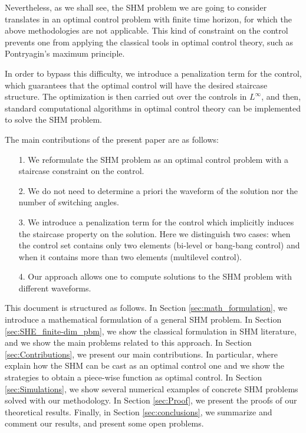\documentclass[twocolumn]{autart}    %
\begin{document}
Nevertheless, as we shall see, the SHM problem we are going to consider translates in an optimal control problem with finite time horizon, for which the above methodologies are not applicable. This kind of constraint on the control prevents one from applying the classical tools in optimal control theory, such as Pontryagin's maximum principle.

In order to bypass this difficulty, we introduce a penalization term for the control, which guarantees that the optimal control will have the desired staircase structure. The optimization is then carried out over the controls in $L^\infty$, and then, standard computational algorithms in optimal control theory can be implemented to solve the SHM problem. 

The main contributions of the present paper are as follows:
\begin{enumerate}
    \item[1.] We reformulate the SHM problem as an optimal control problem with a staircase constraint on the control.
	\item[2.] We do not need to determine a priori the waveform of the solution nor the number of switching angles.  
    \item[3.] We introduce a penalization term for the control which implicitly induces the staircase property on the solution. Here we distinguish two cases: when the control set contains only two elements (bi-level or bang-bang control) and when it contains more than two elements (multilevel control).
    \item[4.] Our approach allows one to compute solutions to the SHM problem with different waveforms.
\end{enumerate}


This document is structured as follows. In Section \ref{sec:math_formulation}, we introduce a mathematical formulation of a general SHM problem. 
In Section \ref{sec:SHE_finite-dim_pbm}, we show the classical formulation in SHM literature, and we show the main problems related to this approach. In Section \ref{sec:Contributions}, we present our main contributions. In particular, where explain how the SHM can be cast as an optimal control one and we show the strategies to obtain a piece-wise function as optimal control. In Section \ref{sec:Simulations}, we show several numerical examples of concrete SHM problems solved with our methodology. In Section \ref{sec:Proof}, we present the proofs of our theoretical results. Finally, in Section \ref{sec:conclusions}, we summarize and comment our results, and present some open problems. 
\end{document}
